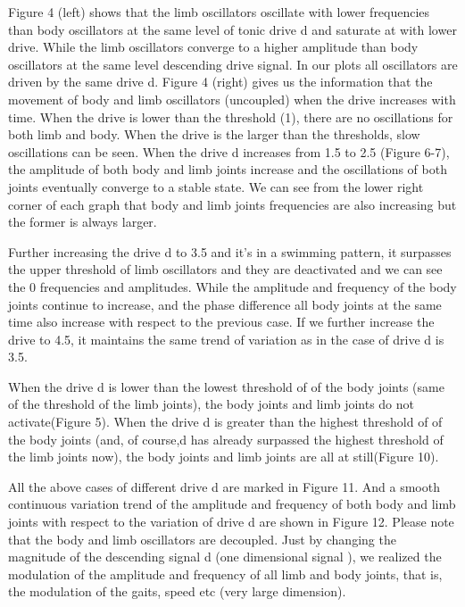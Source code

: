 \documentclass{cmc}
\begin{document}
Figure 4 (left) shows that the limb oscillators oscillate with lower frequencies than body oscillators at the same level of tonic drive d and saturate at with lower drive. While the limb oscillators converge to a higher amplitude than body oscillators at the same level descending drive signal. In our plots all oscillators are driven by the same drive d. Figure 4 (right) gives us the information that the movement of body and limb oscillators (uncoupled) when the drive increases with time. When the drive is lower than the threshold (1), there are no oscillations for both limb and body. When the drive is the larger than the thresholds, slow oscillations can be seen. When the drive d increases from 1.5 to 2.5 (Figure 6-7), the amplitude of both body and limb joints increase and the oscillations of both joints eventually converge to a stable state. We can see from the lower right corner of each graph that body and limb joints frequencies are also increasing but the former is always larger. 

Further increasing the drive d to 3.5 and it's in a swimming pattern, it surpasses the upper threshold of limb oscillators and they are deactivated and we can see the 0 frequencies and amplitudes. While the amplitude and frequency of the body joints continue to increase, and the phase difference all body joints at the same time also increase with respect to the previous 
case. If we further increase the drive to 4.5, it maintains the same trend of variation as in the case of drive d is 3.5.

When the drive d is lower than the lowest threshold of of the body joints (same of the threshold of the limb joints), the body joints and limb joints do not activate(Figure 5). When the drive d is greater than the highest threshold of of the body joints (and, of course,d has already surpassed the highest threshold of the limb joints now), the body joints and limb joints are all at still(Figure 10).

All the above cases of different drive d are marked in Figure 11. And a smooth continuous variation trend of the amplitude and frequency of both body and limb joints with respect to the variation of drive d are shown in Figure 12. Please note that the body and limb oscillators are decoupled. Just by changing the magnitude of the descending signal d (one dimensional signal ), we realized the modulation of the amplitude and frequency of all limb and body joints, that is, the modulation of the gaits, speed etc (very large dimension).
\end{document}
